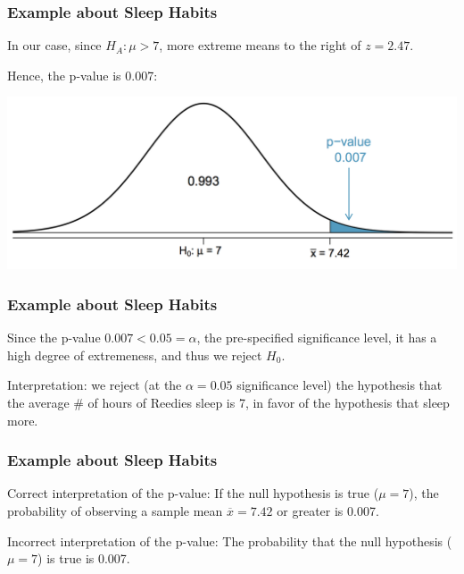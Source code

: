 \documentclass[handout]{beamer}
\newcommand{\blue}[1]{\textcolor{blue2}{#1}}
\newcommand{\xbar}{\overline{x}}
\begin{document}
\begin{frame}
\frametitle{Example about Sleep Habits}
In our case, since $H_A: \mu > 7$, \blue{more extreme} means \blue{to the right} of $z=2.47$.  

\vspace{0.5cm}

Hence, the p-value is 0.007:

\begin{center}
\includegraphics[width=\textwidth]{figure/pvalue.png}
\end{center}

\end{frame}


\begin{frame}
\frametitle{Example about Sleep Habits}
Since the p-value $0.007 < 0.05=\alpha$, the \blue{pre-specified} significance level, it has a high degree of \blue{extremeness}, and thus we \blue{reject $H_0$}.

\vspace{0.5cm}

\pause\blue{Interpretation}: we reject (at the $\alpha=0.05$ significance level) the hypothesis that the average \# of hours of Reedies sleep is 7, in favor of the hypothesis that sleep more.    

\end{frame}


\begin{frame}
\frametitle{Example about Sleep Habits}
\blue{Correct interpretation of the p-value}:  If the null hypothesis is true ($\mu=7$), the probability of observing a sample mean $\xbar=7.42$ or greater is 0.007.  

\vspace{0.5cm}

\pause \blue{Incorrect interpretation of the p-value}:  The probability that the null hypothesis ($\mu=7$) is true is 0.007.  

\end{frame}
\end{document}
